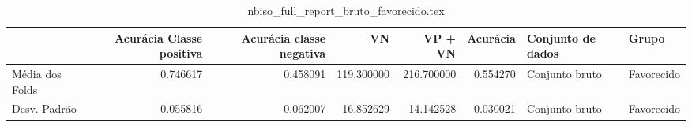 \begin{table}
\centering
\caption{nbiso_full_report_bruto_favorecido.tex}
\label{nbiso_full_report_bruto_favorecido.tex}
\begin{tabular}{lrrrrrll}
\toprule
{}              &  Acurácia Classe positiva &  Acurácia classe negativa &         VN  &    VP + VN  &  Acurácia & Conjunto de dados &       Grupo \\
\midrule
Média dos Folds &                  0.746617 &                  0.458091 &  119.300000 &  216.700000 &  0.554270 &    Conjunto bruto &  Favorecido \\
Desv. Padrão    &                  0.055816 &                  0.062007 &   16.852629 &   14.142528 &  0.030021 &    Conjunto bruto &  Favorecido \\
\bottomrule
\end{tabular}
\end{table}
